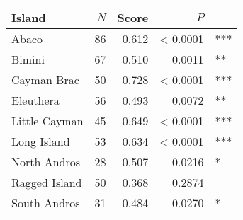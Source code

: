 
\begin{tabular}{lrrrl}
\toprule
Island & $N$ & Score & $P$ & \\
\midrule
Abaco & 86 & 0.612 & < 0.0001 & ***\\
Bimini & 67 & 0.510 & 0.0011 & **\\
Cayman Brac & 50 & 0.728 & < 0.0001 & ***\\
Eleuthera & 56 & 0.493 & 0.0072 & **\\
Little Cayman & 45 & 0.649 & < 0.0001 & ***\\
Long Island & 53 & 0.634 & < 0.0001 & ***\\
North Andros & 28 & 0.507 & 0.0216 & *\\
Ragged Island & 50 & 0.368 & 0.2874 & \\
South Andros & 31 & 0.484 & 0.0270 & *\\
\bottomrule
\end{tabular}